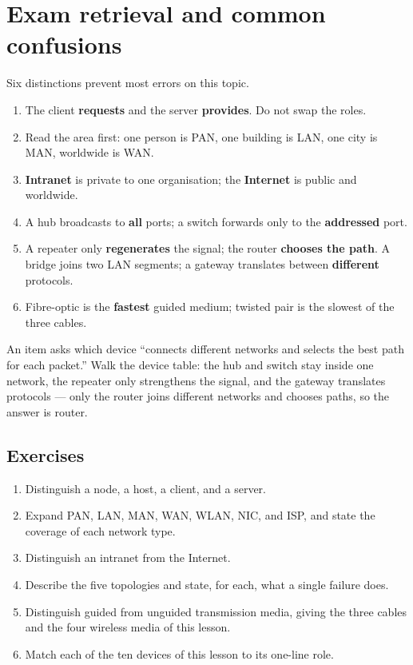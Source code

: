 \section{Exam retrieval and common confusions}
Six distinctions prevent most errors on this topic.
\begin{enumerate}
  \item The client \textbf{requests} and the server \textbf{provides}. Do not
    swap the roles.
  \item Read the area first: one person is PAN, one building is LAN, one
    city is MAN, worldwide is WAN.
  \item \textbf{Intranet} is private to one organisation; the
    \textbf{Internet} is public and worldwide.
  \item A hub broadcasts to \textbf{all} ports; a switch forwards only to
    the \textbf{addressed} port.
  \item A repeater only \textbf{regenerates} the signal; the router
    \textbf{chooses the path}. A bridge joins two LAN segments; a gateway
    translates between \textbf{different} protocols.
  \item Fibre-optic is the \textbf{fastest} guided medium; twisted pair is
    the slowest of the three cables.
\end{enumerate}

\begin{example}
An item asks which device ``connects different networks and selects the best
path for each packet.'' Walk the device table: the hub and switch stay inside
one network, the repeater only strengthens the signal, and the gateway
translates protocols --- only the router joins different networks and
chooses paths, so the answer is router.
\end{example}

\subsection*{Exercises}
\begin{enumerate}[label=\arabic*.]
  \item Distinguish a node, a host, a client, and a server.
  \item Expand PAN, LAN, MAN, WAN, WLAN, NIC, and ISP, and state the coverage
    of each network type.
  \item Distinguish an intranet from the Internet.
  \item Describe the five topologies and state, for each, what a single
    failure does.
  \item Distinguish guided from unguided transmission media, giving the three
    cables and the four wireless media of this lesson.
  \item Match each of the ten devices of this lesson to its one-line role.
\end{enumerate}

